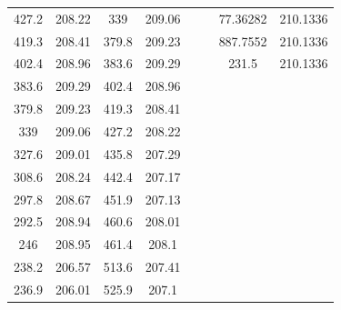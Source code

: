 \begin{center}
\begin{tabular}{|cccc||cc||cc|}
    427.2    & 208.22                   & 339   & 209.06                        &        &                              & 77.36282 & 210.1336                            \\
    419.3    & 208.41                   & 379.8 & 209.23                        &        &                              & 887.7552 & 210.1336                            \\
    402.4    & 208.96                   & 383.6 & 209.29                        &        &                              & 231.5    & 210.1336                            \\
    383.6    & 209.29                   & 402.4 & 208.96                        &        &                              &          &                                     \\
    379.8    & 209.23                   & 419.3 & 208.41                        &        &                              &          &                                     \\
    339      & 209.06                   & 427.2 & 208.22                        &        &                              &          &                                     \\
    327.6    & 209.01                   & 435.8 & 207.29                        &        &                              &          &                                     \\
    308.6    & 208.24                   & 442.4 & 207.17                        &        &                              &          &                                     \\
    297.8    & 208.67                   & 451.9 & 207.13                        &        &                              &          &                                     \\
    292.5    & 208.94                   & 460.6 & 208.01                        &        &                              &          &                                     \\
    246      & 208.95                   & 461.4 & 208.1                         &        &                              &          &                                     \\
    238.2    & 206.57                   & 513.6 & 207.41                        &        &                              &          &                                     \\
    236.9    & 206.01                   & 525.9 & 207.1                         &        &                              &          &                                     \\

\end{tabular}
\end{center}
